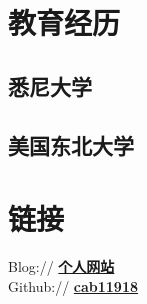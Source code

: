 \documentclass[]{deedy-resume-openfont}
\begin{document}
%
%

%
%

%
%

\begin{minipage}[t]{0.25\textwidth} 


\section{教育经历} 
\sectionsep

\subsection{悉尼大学}
\sectionsep

\subsection{美国东北大学}
\sectionsep


\section{链接}
\sectionsep
Blog://  \href{https://cab11918.github.io/hugo-pweb}{\bf 个人网站} \\
Github:// \href{https://github.com/cab11918}{\bf cab11918} \\



\end{minipage}
\end{document}
